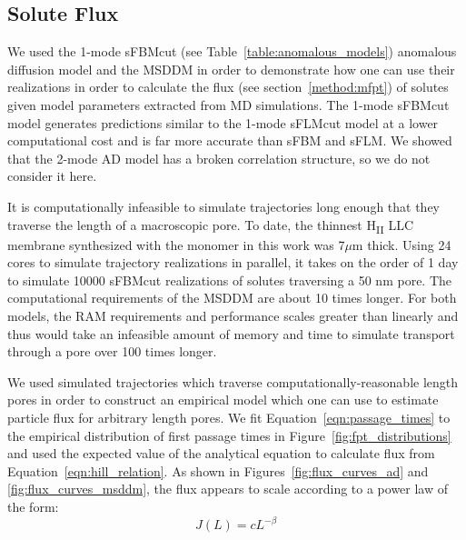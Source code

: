 \documentclass[12pt]{article}
\begin{document}
  \subsection{Solute Flux}\label{section:mfpt}
  
  We used the 1-mode sFBMcut (see Table~\ref{table:anomalous_models}) anomalous 
  diffusion model and the MSDDM in order to demonstrate how one can use their realizations
  in order to calculate the flux (see section~\ref{method:mfpt}) of solutes given model 
  parameters extracted from MD simulations. The 1-mode sFBMcut model generates predictions
  similar to the 1-mode sFLMcut model at a lower computational cost and is far more
  accurate than sFBM and sFLM. We showed that the 2-mode AD model has a broken correlation
  structure, so we do not consider it here.

  It is computationally infeasible to simulate trajectories long enough that they
  traverse the length of a macroscopic pore. To date, the thinnest H\textsubscript{II}
  LLC membrane synthesized with the monomer in this work was 7$\mu$m thick. Using
  24 cores to simulate trajectory realizations in parallel, it takes on the order 
  of 1 day to simulate 10000 sFBMcut realizations of solutes traversing a 50 nm pore.
  The computational requirements of the MSDDM are about 10 times longer. For both
  models, the RAM requirements and performance scales greater than linearly and 
  thus would take an infeasible amount of memory and time to simulate transport 
  through a pore over 100 times longer.
  
  We used simulated trajectories which traverse computationally-reasonable length
  pores in order to construct an empirical model which one can use to estimate 
  particle flux for arbitrary length pores. We fit Equation~\ref{eqn:passage_times}
  to the empirical distribution of first passage times in Figure~\ref{fig:fpt_distributions}
  and used the expected value of the analytical equation to calculate flux from 
  Equation~\ref{eqn:hill_relation}. As shown in Figures~\ref{fig:flux_curves_ad} and
  \ref{fig:flux_curves_msddm}, the flux appears to scale according to a power law 
  of the form:
  \begin{equation}
  J(L) = cL^{-\beta} 
  \label{eqn:flux_decay}
  \end{equation}
  
\end{document}
